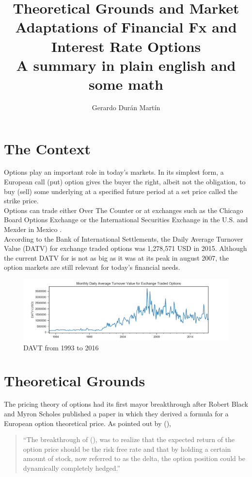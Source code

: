\documentclass{article}
\title{Theoretical Grounds and Market Adaptations of Financial Fx and Interest Rate Options \\ \large A summary in plain english and some math}
\author{Gerardo Dur\'an Mart\'in}
\newcommand{\Mycite}[1]{%
 \citeauthor{#1}(\citeyear{#1})}
\begin{document}
\graphicspath{ {images/} }
\maketitle

\section{The Context}
Options play an important role in today’s markets. In its simplest form, a European call (put) option gives the buyer the right, albeit not the obligation, to buy (sell) some underlying at a specified future period at a set price called the strike price.\\

Options can trade either Over The Counter or at exchanges such as the Chicago Board Options Exchange or the International Securities Exchange in the U.S.\cite{sec_listed} and Mexder in Mexico \citep{mexder} .\\

According to the Bank of International Settlements, the Daily Average Turnover Value (DATV) for exchange traded options was 1,278,571 USD in 2015. Although the current DATV for is not as big as it was at its peak in august 2007, the option markets are still relevant for today's financial needs.

\begin{figure}[h]
    \centering
    \includegraphics[width=1.0\textwidth]{DAVT}
    \caption{DAVT from 1993 to 2016}
\end{figure}

\section{Theoretical Grounds}
The pricing theory of options had its first mayor breakthrough after Robert Black and Myron Scholes published a paper in which they derived a formula for a European option theoretical price. As pointed out by \Mycite{pre_bs},

\begin{quote}
``The breakthrough of \Mycite{black_scholes}, was to realize that the expected return of the option price should be the risk free rate and that by holding a certain amount of stock, now referred to as the delta, the option position could be dynamically completely hedged.''
\end{quote} 
\end{document}
